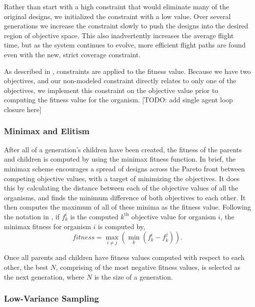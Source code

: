\documentclass[letterpaper, 10 pt, conference]{ieeeconf}  %
\newcommand{\todo}[1]{{\color{blue}[TODO: #1]}}
\begin{document}
Rather than start with a high constraint that would eliminate many of the original designs, we initialized the constraint with a low value. Over several generations we increase the constraint slowly to push the designs into the desired region of objective space. This also inadvertently increases the average flight time, but as the system continues to evolve, more efficient flight paths are found even with the new, strict coverage constraint.

As described in \cite{Parkinson2019}, constraints are applied to the fitness value. Because we have two objectives, and our non-modeled constraint directly relates to only one of the objectives, we implement this constraint on the objective value prior to computing the fitness value for the organism.
\todo{add single agent loop closure here}

\subsubsection{Minimax and Elitism}

After all of a generation's children have been created, the fitness of the parents and children is computed by using the minimax fitness function. In brief, the minimax scheme encourages a spread of designs across the Pareto front between competing objective values, with a target of minimizing the objectives. It does this by calculating the distance between each of the objective values of all the organisms, and finds the minimum difference of both objectives to each other. It then computes the maximum of all of these minima as the fitness value. Following the notation in \cite{Parkinson2019}, if $f_k^i$ is the computed $k^{\mathrm{th}}$ objective value for organism $i$, the minimax fitness for organism $i$ is computed by,
\begin{equation}%
    fitness = \max_{i \neq j}\left(\min_{k}\left(f_k^i - f_k^j\right)\right).
\end{equation}

Once all parents and children have fitness values computed with respect to each other, the best $N$, comprising of the most negative fitness values, is selected as the next generation, where $N$ is the size of a generation.

\subsubsection{Low-Variance Sampling}
\end{document}
